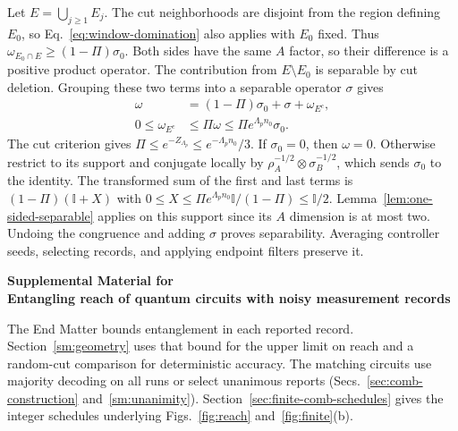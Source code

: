 \documentclass[aps,prl,twocolumn,superscriptaddress,longbibliography,reprint,floatfix]{revtex4-2}
\newcommand{\Id}{\mathbb I}
\begin{document}
Let $E=\bigcup_{j\ge1}E_j$. The cut neighborhoods are disjoint from
the region defining $E_0$, so Eq.~\eqref{eq:window-domination} also
applies with $E_0$ fixed. Thus $\omega_{E_0\cap E}\ge(1-\Pi)\sigma_0$.
Both sides have the same $A$ factor, so their difference is a positive
product operator. The contribution from $E\setminus E_0$ is separable
by cut deletion. Grouping these two terms into a separable operator
$\sigma$ gives
\begin{equation}
 \begin{aligned}
 \omega &=(1-\Pi)\sigma_0+\sigma+\omega_{E^c},\\
 0\le\omega_{E^c}&\le\Pi\omega\le\Pi e^{\Lambda_p n_0}\sigma_0 .
 \end{aligned}
 \label{eq:strict-choi}
\end{equation}
The cut criterion gives $\Pi\le e^{-Z_{\Lambda_p}}\le e^{-\Lambda_p n_0}/3$.
If $\sigma_0=0$, then $\omega=0$. Otherwise restrict to its support
and conjugate locally by $\rho_A^{-1/2}\otimes\sigma_B^{-1/2}$, which
sends $\sigma_0$ to the identity. The transformed sum of the first and
last terms is $(1-\Pi)(\Id+X)$ with
$0\le X\le\Pi e^{\Lambda_p n_0}\Id/(1-\Pi)\le\Id/2$.
Lemma~\ref{lem:one-sided-separable} applies on this support since its
$A$ dimension is at most two. Undoing the congruence and adding
$\sigma$ proves separability. Averaging controller seeds, selecting
records, and applying endpoint filters preserve it.

\clearpage
\onecolumngrid
\begin{center}
\textbf{\large Supplemental Material for\\
Entangling reach of quantum circuits with noisy measurement records}\\[3pt]
\end{center}
\setcounter{equation}{0}
\setcounter{figure}{0}
\setcounter{table}{0}
\setcounter{section}{0}
\renewcommand{\theequation}{S\arabic{equation}}
\renewcommand{\thefigure}{S\arabic{figure}}
\renewcommand{\thetable}{S\arabic{table}}
\renewcommand{\theHtable}{S.\arabic{table}}
\renewcommand{\thesection}{S\arabic{section}}
\renewcommand{\theHequation}{S.\arabic{equation}}
\renewcommand{\theHfigure}{S.\arabic{figure}}
\renewcommand{\theHsection}{S.\arabic{section}}
\setcounter{secnumdepth}{2}

The End Matter bounds entanglement in each reported record. Section~\ref{sm:geometry}
uses that bound for the upper limit on reach and a random-cut comparison
for deterministic accuracy. The matching circuits use majority decoding
on all runs or select unanimous reports (Secs.~\ref{sec:comb-construction}
and~\ref{sm:unanimity}). Section~\ref{sec:finite-comb-schedules} gives the
integer schedules underlying Figs.~\ref{fig:reach} and~\ref{fig:finite}(b).
\end{document}

